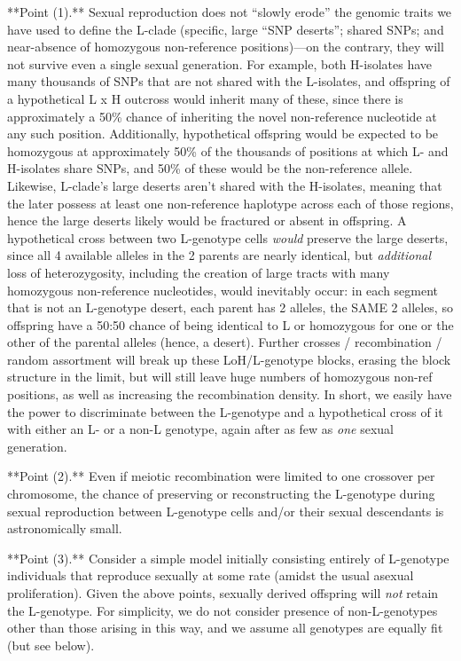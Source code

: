 \documentclass{article}\usepackage[]{graphicx}\usepackage[]{color}
\begin{document}
**Point (1).** Sexual reproduction does not ``slowly erode'' the genomic traits we have used to
define the L-clade (specific, large ``SNP deserts''; shared SNPs; and near-absence of homozygous
non-reference positions)---on the contrary, they will not survive even a single sexual generation.
For example, both H-isolates have many thousands of SNPs that are not shared with the L-isolates,
and offspring of a hypothetical L x H outcross would inherit many of these, since there is
approximately a 50\% chance of inheriting the novel non-reference nucleotide at any such position.
Additionally, hypothetical offspring would be expected to be homozygous at approximately 50\% of the
thousands of positions at which L- and H-isolates share SNPs, and 50\% of these would be the
non-reference allele.  Likewise, L-clade's large deserts aren't shared with the H-isolates, meaning
that the later possess at least one non-reference haplotype across each of those regions, hence the
large deserts likely would be fractured or absent in offspring.  A hypothetical cross between two
L-genotype cells \textit{would} preserve the large deserts, since all 4 available alleles in the 2
parents are nearly identical, but \textit{additional} loss of heterozygosity, including the creation
of large tracts with many homozygous non-reference nucleotides, would inevitably occur: in each
segment that is not an L-genotype desert, each parent has 2 alleles, the SAME 2 alleles, so
offspring have a 50:50 chance of being identical to L or homozygous for one or the other of the
parental alleles (hence, a desert).  Further crosses / recombination / random assortment will break
up these LoH/L-genotype blocks, erasing the block structure in the limit, but will still leave huge
numbers of homozygous non-ref positions, as well as increasing the recombination density.  In short,
we easily have the power to discriminate between the L-genotype and a hypothetical cross of it with
either an L- or a non-L genotype, again after as few as \textit{one} sexual generation.

**Point (2).** Even if meiotic recombination were limited to one crossover per chromosome, the
chance of preserving or reconstructing the L-genotype during sexual reproduction between L-genotype
cells and/or their sexual descendants is astronomically small.

**Point (3).** Consider a simple model initially consisting entirely of L-genotype individuals that
reproduce sexually at some rate (amidst the usual asexual proliferation).  Given the above points,
sexually derived offspring will \textit{not} retain the L-genotype.  For simplicity, we do not
consider presence of non-L-genotypes other than those arising in this way, and we assume all
genotypes are equally fit (but see below).
\end{document}
